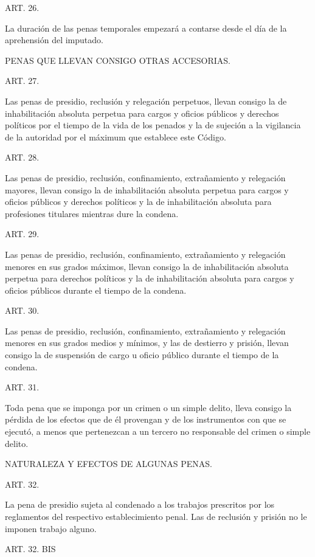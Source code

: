     ART. 26.

    La duración de las penas temporales empezará a contarse desde el día de la aprehensión del imputado.

    PENAS QUE LLEVAN CONSIGO OTRAS ACCESORIAS.


    ART. 27.

    Las penas de presidio, reclusión y relegación perpetuos, llevan consigo la de inhabilitación absoluta perpetua para cargos y oficios públicos y derechos políticos por el tiempo de la vida de los penados y la de sujeción a la vigilancia de la autoridad por el máximum que establece este Código.



    ART. 28.

    Las penas de presidio, reclusión, confinamiento, extrañamiento y relegación mayores, llevan consigo la de inhabilitación absoluta perpetua para cargos y oficios públicos y derechos políticos y la de inhabilitación absoluta para profesiones titulares mientras dure la condena.


    ART. 29.

    Las penas de presidio, reclusión, confinamiento, extrañamiento y relegación menores en sus grados máximos, llevan consigo la de inhabilitación absoluta perpetua para derechos políticos y la de inhabilitación absoluta para cargos y oficios públicos durante el tiempo de la condena.


    ART. 30.

    Las penas de presidio, reclusión, confinamiento, extrañamiento y relegación menores en sus grados medios y mínimos, y las de destierro y prisión, llevan consigo la de suspensión de cargo u oficio público durante el tiempo de la condena.



    ART. 31.

    Toda pena que se imponga por un crimen o un simple delito, lleva consigo la pérdida de los efectos que de él provengan y de los instrumentos con que se ejecutó, a menos que pertenezcan a un tercero no responsable del crimen o simple delito.


    NATURALEZA Y EFECTOS DE ALGUNAS PENAS.


    ART. 32.

    La pena de presidio sujeta al condenado a los trabajos prescritos por los reglamentos del respectivo establecimiento penal. Las de reclusión y prisión no le imponen trabajo alguno.


    ART. 32. BIS

